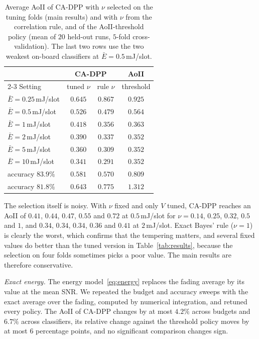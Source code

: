 \documentclass[5p,twocolumn]{elsarticle}
\theoremstyle{remark}
\begin{document}
\begin{table}[t]
\caption{Average AoII of CA-DPP with $\nu$ selected on the tuning folds (main results) and with $\nu$ from the correlation rule, and of the AoII-threshold policy (mean of $20$ held-out runs, $5$-fold cross-validation). The last two rows use the two weakest on-board classifiers at $\bar E=0.5$\,mJ/slot.}\label{tab:nu}
\centering\footnotesize
\begin{tabular}{@{}lccc@{}}
\toprule
 & \multicolumn{2}{c}{CA-DPP} & AoII\\
\cmidrule(lr){2-3}
Setting & tuned $\nu$ & rule $\nu$ & threshold\\
\midrule
$\bar E=0.25$\,mJ/slot & $0.645$ & $0.867$ & $0.925$\\
$\bar E=0.5$\,mJ/slot & $0.526$ & $0.479$ & $0.564$\\
$\bar E=1$\,mJ/slot & $0.418$ & $0.356$ & $0.363$\\
$\bar E=2$\,mJ/slot & $0.390$ & $0.337$ & $0.352$\\
$\bar E=5$\,mJ/slot & $0.360$ & $0.309$ & $0.352$\\
$\bar E=10$\,mJ/slot & $0.341$ & $0.291$ & $0.352$\\
accuracy $83.9\%$ & $0.581$ & $0.570$ & $0.809$\\
accuracy $81.8\%$ & $0.643$ & $0.775$ & $1.312$\\
\bottomrule
\end{tabular}
\end{table}

The selection itself is noisy. With $\nu$ fixed and only $V$ tuned, CA-DPP reaches an AoII of $0.41$, $0.44$, $0.47$, $0.55$ and $0.72$ at $0.5$\,mJ/slot for $\nu=0.14$, $0.25$, $0.32$, $0.5$ and $1$, and $0.34$, $0.34$, $0.34$, $0.36$ and $0.41$ at $2$\,mJ/slot. Exact Bayes' rule ($\nu=1$) is clearly the worst, which confirms that the tempering matters, and several fixed values do better than the tuned version in Table~\ref{tab:results}, because the selection on four folds sometimes picks a poor value. The main results are therefore conservative.

\emph{Exact energy.} The energy model~\eqref{eq:energy} replaces the fading average by its value at the mean SNR. We repeated the budget and accuracy sweeps with the exact average over the fading, computed by numerical integration, and retuned every policy. The AoII of CA-DPP changes by at most $4.2\%$ across budgets and $6.7\%$ across classifiers, its relative change against the threshold policy moves by at most $6$ percentage points, and no significant comparison changes sign.
\end{document}
